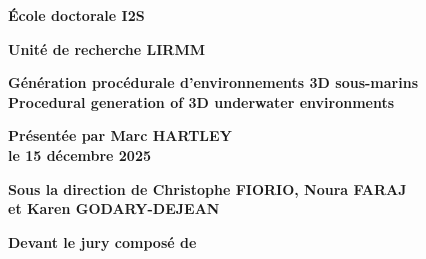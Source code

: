 \begin{titlepage}
{		\bigskip
		\textbf{École doctorale I2S}
		
		\bigskip
		\textbf{Unité de recherche LIRMM}
		
		
		\color{Titleblue}
		\fontsize{17}{20.4}\selectfont
		\vspace{2cm}
		\textbf{Génération procédurale d'environnements 3D sous-marins\\Procedural generation of 3D underwater environments}
		
		
		\vspace{4cm}
		\fontsize{15}{18}\selectfont
		\color{black}
		\textbf{Présentée par Marc HARTLEY \\
			le 15 décembre 2025}
		
		\bigskip
		\fontsize{13}{15.6}\selectfont
		\textbf{Sous la direction de Christophe FIORIO, 
			Noura FARAJ \\
			et Karen GODARY-DEJEAN}
		
		\vspace{1.5cm}
		\normalsize
		\textbf{Devant le jury composé de}\\
		\bigskip
		\fontsize{10}{12}\selectfont
		\vspace{1.5mm}
		\begin{tabularx}{\textwidth}{l l X r}


\end{tabularx}}
\end{titlepage}
